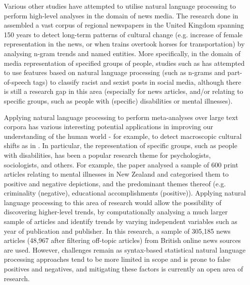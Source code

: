 \documentclass{report}
\begin{document}
Various other studies have attempted to utilise natural language processing to perform high-level analyses in the domain of news media.
The research done in \cite{lansdall2017content} assembled a vast corpus of regional newspapers in the United Kingdom spanning 150 years to detect long-term patterns of cultural change (e.g. increase of female representation in the news, or when trains overtook horses for transportation) by analysing n-gram trends and named entities. 
More specifically, in the domain of media representation of specified groups of people, studies such as \cite{waseem2016you} has attempted to use features based on natural language processing (such as n-grams and part-of-speech tags) to classify racist and sexist posts in social media, although there is still a research gap in this area (especially for news articles, and/or relating to specific groups, such as people with (specific) disabilities or mental illnesses).

Applying natural language processing to perform meta-analyses over large text corpora has various interesting potential applications in improving our understanding of the human world - for example, to detect macroscopic cultural shifts as in \cite{lansdall2017content}.
In particular, the representation of specific groups, such as people with disabilities, has been a popular research theme for psychologists, sociologists, and others.
For example, the paper \cite{coverdale2002depictions} analysed a sample of 600 print articles relating to mental illnesses in New Zealand and categorised them to positive and negative depictions, and the predominant themes thereof (e.g. criminality (negative), educational accomplishments (positive)).
Applying natural language processing to this area of research would allow the possibility of discovering higher-level trends, by computationally analysing a much larger sample of articles and identify trends by varying independent variables such as year of publication and publisher.
In this research, a sample of 305,185 news articles (48,967 after filtering off-topic articles) from British online news sources are used.
However, challenges remain as syntax-based statistical natural language processing approaches tend to be more limited in scope and is prone to false positives and negatives, and mitigating these factors is currently an open area of research.
\end{document}
